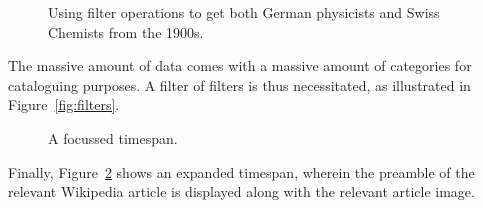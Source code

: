 \begin{figure}[H]
  \centering
  \begin{scale}{0.5}
    
  \end{scale}
  \caption{Using filter operations to get both German physicists and Swiss Chemists from the 1900s.}
  \label{fig:filteropss}
\end{figure}

The massive amount of data comes with a massive amount of categories for 
cataloguing purposes. A filter of filters is thus necessitated, as illustrated 
in Figure~\ref{fig:filters}.

\begin{figure}[H]
  \centering
  \begin{scale}{0.3}
    
  \end{scale}
  \caption{A focussed timespan.}
  \label{fig:focussed}
\end{figure}

Finally, Figure~\ref{fig:focussed} shows an expanded timespan, wherein the 
preamble of the relevant Wikipedia article is displayed along with the 
relevant article image.
